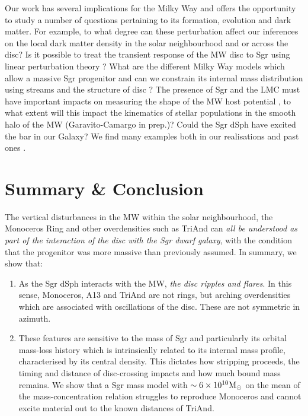 \documentclass[useAMS,usenatbib]{mnras}
\begin{document}
{Our work has several implications for the Milky Way and offers the opportunity to study a number of questions pertaining to its formation, evolution and dark matter. For example, to what degree can these perturbation affect our inferences on the local dark matter density in the solar neighbourhood and or across the disc? Is it possible to treat the transient response of the MW disc to Sgr using linear perturbation theory \citep{weinberg98,monari15}? What are the different Milky Way models which allow a massive Sgr progenitor and can we constrain its internal mass distribution using streams and the structure of disc \citep{gibbons16, dierickx17}? The presence of Sgr and the LMC must have important impacts on measuring the shape of the MW host potential \cite{veraciro14,gomez15}, to what extent will this impact the kinematics of stellar populations in the smooth halo of the MW (Garavito-Camargo in prep.)? Could the Sgr dSph have excited the bar in our Galaxy? We find many examples both in our realisations and past ones \citep{purcell11}. 

\section{Summary \& Conclusion}

The vertical disturbances in the MW within the solar neighbourhood, the Monoceros Ring and other overdensities such as TriAnd can {\it all be understood as part of the interaction of the disc with the Sgr dwarf galaxy}, with the condition that the progenitor was more massive than previously assumed. In summary, we show that:

\begin{enumerate}
\item As the Sgr dSph interacts with the MW, {\it the disc ripples and flares}. In this sense, Monoceros, A13 and TriAnd are not rings, but arching overdensities which are associated with oscillations of the disc. These are not symmetric in azimuth.

\item These features are sensitive to the mass of Sgr and particularly its orbital mass-loss history which is intrinsically related to its internal mass profile, characterised by its central density. This dictates how stripping proceeds, the timing and distance of disc-crossing impacts and how much bound mass remains. We show that a Sgr mass model with $\sim6\times10^{10} \rm{M_{\odot}}$ on the mean of the mass-concentration relation struggles to reproduce Monoceros and cannot excite material out to the known distances of TriAnd.


\end{enumerate}}
\end{document}

